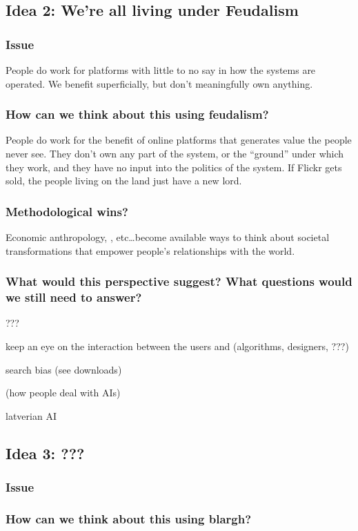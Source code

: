 \documentclass[main]{subfiles}
\begin{document}
\subsection{Idea 2: We're all living under Feudalism}
\subsubsection{Issue}
People do work for platforms with little to no say in how the systems are operated.
We benefit superficially, but don't meaningfully own anything.

\subsubsection{How can we think about this using feudalism?}
People do work for the benefit of online platforms that generates value the people never see.
They don't own any part of the system, or the ``ground'' under which they work, and they have no input into the politics of the system.
If Flickr gets sold, the people living on the land just have a new lord.

\subsubsection{Methodological wins?} Economic anthropology, \citeauthor{polanyi1944great}, etc\dots become available ways to think about societal transformations that empower people's relationships with the world.

\subsubsection{What would this perspective suggest? What questions would we still need to answer?}
???

keep an eye on the interaction between the users and (algorithms, designers, ???)

search bias (see downloads)


(how people deal with AIs)

latverian AI


\subsection{Idea 3: ???}
\subsubsection{Issue}

\subsubsection{How can we think about this using blargh?}
\end{document}

